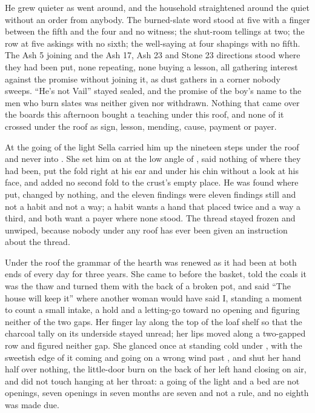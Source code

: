 He grew quieter as  went around, and the household straightened around the quiet without an order from anybody. The burned-slate word stood at five with a finger between the fifth and the four and no witness; the shut-room tellings at two; the row at five askings with no sixth; the well-saying at four shapings with no fifth. The Ash 5 joining and the Ash 17, Ash 23 and Stone 23 directions stood where they had been put, none repeating, none buying a lesson, all gathering interest against the promise without joining it, as dust gathers in a corner nobody sweeps. “He's not Vail” stayed sealed, and the promise of the boy's name to the men who burn slates was neither given nor withdrawn. Nothing that came over the boards this afternoon bought a teaching under this roof, and none of it crossed under the roof as sign, lesson, mending, cause, payment or payer.

\scenebreak

At the going of the light Sella carried him up the nineteen steps under the roof and never into . She set him on  at the low angle of , said nothing of where they had been, put the fold right at his ear and under his chin without a look at his face, and added no second fold to the crust's empty place. He was found where put, changed by nothing, and the eleven findings were eleven findings still and not a habit and not a way; a habit wants a hand that placed twice and a way a third, and both want a payer where none stood. The thread stayed frozen and unwiped, because nobody under any roof has ever been given an instruction about the thread.

Under the roof the grammar of the hearth was renewed as it had been at both ends of every day for three years. She came to  before the basket, told the coals it was the thaw and turned them with the back of a broken pot, and said “The house will keep it” where another woman would have said I, standing a moment to count a small intake, a hold and a letting-go toward no opening and figuring neither of the two gaps. Her finger lay along the top of the loaf shelf so that the charcoal tally on its underside stayed unread; her lips moved along a two-gapped row and figured neither gap. She glanced once at  standing cold under , with the sweetish edge of it coming and going on a wrong wind past , and shut her hand half over nothing, the little-door burn on the back of her left hand closing on air, and did not touch  hanging at her throat: a going of the light and a bed are not openings, seven openings in seven months are seven and not a rule, and no eighth was made due.

